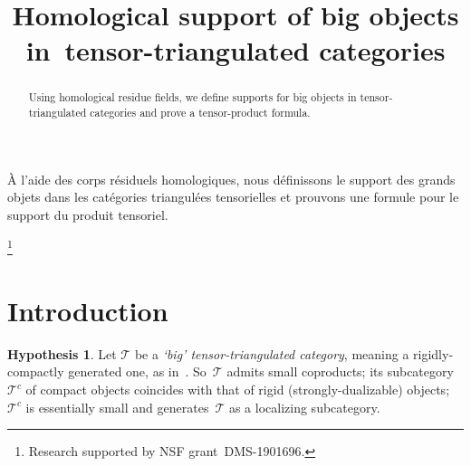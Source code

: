 \documentclass[JEP,XML,SOM,Unicode]{cedram}
\numberwithin{equation}{section}
\theoremstyle{definition}
\newtheorem{Hyp}[equation]{Hypothesis}
\newcommand{\cat}[1]{\mathscr{#1}}
\newcommand{\cT}{\cat{T}}
\begin{document}
\frontmatter

\title[Homological support in big tt-categories]{Homological support of big objects in~tensor-triangulated categories}

\author[\initial{P.} \lastname{Balmer}]{ }
\address{Mathematics Department, UCLA,\\
Los Angeles, CA 90095-1555, USA}

\begin{abstract}
Using homological residue fields, we define supports for big objects in tensor-triangulated categories and prove a tensor-product formula.
\end{abstract}




\begin{altabstract}
À l'aide des corps résiduels homologiques, nous définissons le support des grands objets dans les catégories triangulées tensorielles et prouvons une formule pour le support du produit tensoriel.
\end{altabstract}

\thanks{Research supported by NSF grant~DMS-1901696.}

\maketitle

\tableofcontents
\mainmatter

\section{Introduction}

\begin{Hyp}
\label{Hyp:big-tt}
Let $\cT$ be a \emph{`big' tensor-triangulated category}, meaning a rigidly-compactly generated one, as in~\cite{BalmerFavi11}. So~$\cT$ admits small coproducts; its subcategory~$\cT^c$ of compact objects coincides with that of rigid (strongly-dualizable) objects; $\cT^c$ is essentially small and generates~$\cT$ as a localizing subcategory.
\end{Hyp}
\end{document}

